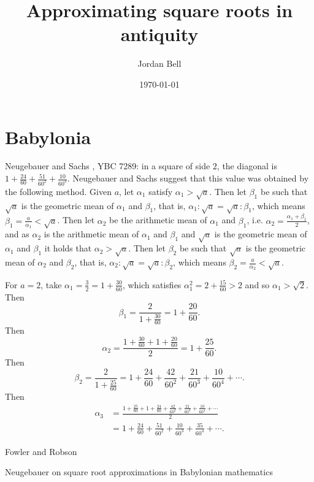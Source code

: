 \documentclass{amsart}
\theoremstyle{definition}
\begin{document}
\title{Approximating square roots in  antiquity}
\author{Jordan Bell}
\address{Department of Mathematics, University of Toronto, Toronto, Ontario, Canada}
\date{\today}

\maketitle

\tableofcontents


\section{Babylonia}
Neugebauer and Sachs \cite[pp.~42--43]{cuneiform}, YBC 7289: in a square of side $2$, 
the diagonal is  $1+\frac{24}{60}+\frac{51}{60^2}+\frac{10}{60^3}$.  
Neugebauer and Sachs suggest that this value was obtained by the following method.
Given $a$, let $\alpha_1$ satisfy  $\alpha_1>\sqrt{a}$. 
Then let $\beta_1$ be such that 
$\sqrt{a}$ is the geometric mean of $\alpha_1$ and $\beta_1$, that is, $\alpha_1:\sqrt{a} = \sqrt{a}:\beta_1$, which
means
$\beta_1 = \frac{a}{\alpha_1}<\sqrt{a}$. 
Then let
$\alpha_2$ be the arithmetic mean of $\alpha_1$ and $\beta_1$,
i.e. $\alpha_2 = \frac{\alpha_1+\beta_1}{2}$,
and as $\alpha_2$ is the arithmetic mean of $\alpha_1$ and $\beta_1$
and $\sqrt{a}$ is the geometric mean of $\alpha_1$ and $\beta_1$ it holds that $\alpha_2>\sqrt{a}$. 
Then let $\beta_2$ be such that $\sqrt{a}$ is the geometric mean of $\alpha_2$ and $\beta_2$, that is,
$\alpha_2:\sqrt{a}=\sqrt{a}:\beta_2$, which means $\beta_2=\frac{a}{\alpha_2}<\sqrt{a}$. 

For $a=2$, take $\alpha_1=\frac{3}{2}=1+\frac{30}{60}$, which satisfies $\alpha_1^2=2+\frac{15}{60}>2$ and so $\alpha_1>\sqrt{2}$.
Then
\[
\beta_1  =\frac{2}{1+\frac{30}{60}}=1+\frac{20}{60}.
\]
Then
\[
\alpha_2 = \frac{1+\frac{30}{60}+1+\frac{20}{60}}{2} = 1 + \frac{25}{60}.
\]
Then 
\[
\beta_2 = \frac{2}{1 + \frac{25}{60}} = 1+\frac{24}{60}+\frac{42}{60^2}+\frac{21}{60^3}
+\frac{10}{60^4}+\cdots.
\]
Then
\begin{align*}
\alpha_3 &= \frac{1 + \frac{25}{60} + 1+\frac{24}{60}+\frac{42}{60^2}+\frac{21}{60^3}
+\frac{10}{60^4}+\cdots}{2}\\
&=1+\frac{24}{60}+\frac{51}{60^2}+\frac{10}{60^3}+\frac{35}{60^4}+\cdots.
\end{align*}

Fowler and Robson \cite{YBC7289}

Neugebauer \cite{neugebauer1931} on square root approximations in Babylonian mathematics
\end{document}
